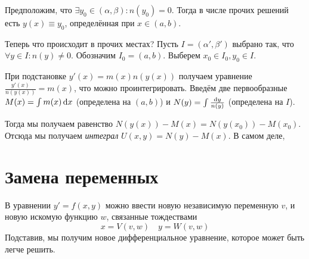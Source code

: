 \documentclass[a4paper]{report}
\begin{document}
    Предположим, что $\exists y_0 \in (\alpha, \beta): n(y_0) = 0$.
    Тогда в числе прочих решений есть $y(x) \equiv y_0$, определённая при $x \in (a, b)$.

    Теперь что происходит в прочих местах?
    Пусть $I = (\alpha', \beta')$ выбрано так, что $\forall y \in I: n(y) \ne 0$.
    Обозначим $I_0 = (a, b)$.
    Выберем $x_0 \in I_0, y_0 \in I$.

    При подстановке $y'(x) = m(x)n(y(x))$ получаем уравнение $\frac{y'(x)}{n(y(x))} = m(x)$, что можно проинтегрировать.
    Введём две первообразные $M(x) = \int\limits m(x)\operatorname{d}\! x$ (определена на $(a, b)$) и $N(y) = \int\limits \frac{\operatorname{d}\! y}{n(y)}$ (определена на $I$).

    Тогда мы получаем равенство $N(y(x)) - M(x) = N(y(x_0)) - M(x_0)$.
    Отсюда мы получаем \emph{интеграл} $U(x, y) = N(y) - M(x)$.
    В самом деле,


    \section{Замена переменных}
    В уравнении $y' = f(x, y)$ можно ввести новую независимую переменную $v$, и новую искомую функцию $w$, связанные тождествами
    \[x = V(v, w) \quad y = W(v, w)\]
    Подставив, мы получим новое дифференциальное уравнение, которое может быть легче решить.
\end{document}
